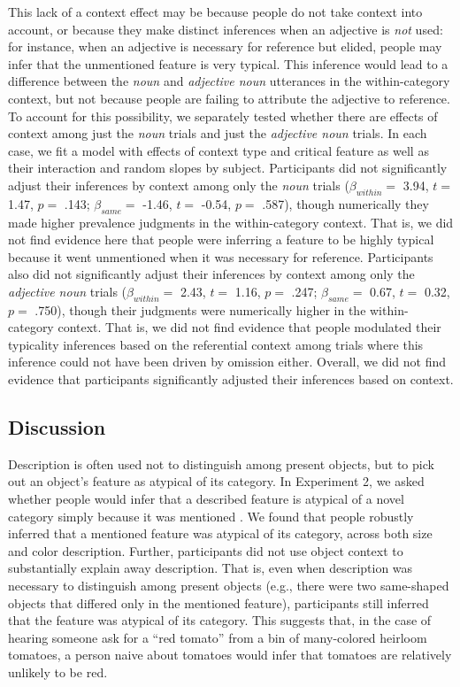 \documentclass[
  english,
  man,floatsintext]{apa6}
\begin{document}
This lack of a context effect may be because people do not take context into account, or because they make distinct inferences when an adjective is \emph{not} used: for instance, when an adjective is necessary for reference but elided, people may infer that the unmentioned feature is very typical. This inference would lead to a difference between the \emph{noun} and \emph{adjective noun} utterances in the within-category context, but not because people are failing to attribute the adjective to reference. To account for this possibility, we separately tested whether there are effects of context among just the \emph{noun} trials and just the \emph{adjective noun} trials. In each case, we fit a model with effects of context type and critical feature as well as their interaction and random slopes by subject.
Participants did not significantly adjust their inferences by context among only the \emph{noun} trials (\(\beta_{within} =\) 3.94, \(t =\) 1.47, \(p =\) .143; \(\beta_{same} =\) -1.46, \(t =\) -0.54, \(p =\) .587), though numerically they made higher prevalence judgments in the within-category context. That is, we did not find evidence here that people were inferring a feature to be highly typical because it went unmentioned when it was necessary for reference. Participants also did not significantly adjust their inferences by context among only the \emph{adjective noun} trials (\(\beta_{within} =\) 2.43, \(t =\) 1.16, \(p =\) .247; \(\beta_{same} =\) 0.67, \(t =\) 0.32, \(p =\) .750), though their judgments were numerically higher in the within-category context. That is, we did not find evidence that people modulated their typicality inferences based on the referential context among trials where this inference could not have been driven by omission either. Overall, we did not find evidence that participants significantly adjusted their inferences based on context.

\hypertarget{discussion-1}{%
\subsection{Discussion}\label{discussion-1}}

Description is often used not to distinguish among present objects, but to pick out an object's feature as atypical of its category. In Experiment 2, we asked whether people would infer that a described feature is atypical of a novel category simply because it was mentioned . We found that people robustly inferred that a mentioned feature was atypical of its category, across both size and color description. Further, participants did not use object context to substantially explain away description. That is, even when description was necessary to distinguish among present objects (e.g., there were two same-shaped objects that differed only in the mentioned feature), participants still inferred that the feature was atypical of its category. This suggests that, in the case of hearing someone ask for a ``red tomato'' from a bin of many-colored heirloom tomatoes, a person naive about tomatoes would infer that tomatoes are relatively unlikely to be red.
\end{document}
